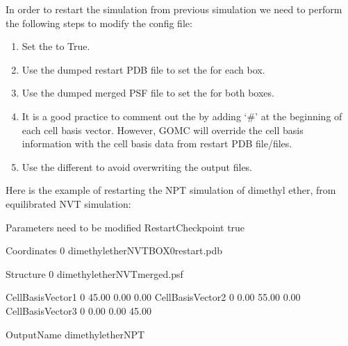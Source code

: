 \documentclass[letterpaper,10pt,english]{sphinxmanual}
\begin{document}
In order to restart the simulation from previous simulation we need to perform the following steps to modify the config file:
\begin{enumerate}
%
\item {} 
Set the  to True.

\item {} 
Use the dumped restart PDB file to set the  for each box.

\item {} 
Use the dumped merged PSF file to set the  for both boxes.

\item {} 
It is a good practice to comment out the  by adding ‘\#’ at the beginning of each cell basis vector. However, GOMC will override
the cell basis information with the cell basis data from restart PDB file/files.

\item {} 
Use the different  to avoid overwriting the output files.

\end{enumerate}

Here is the example of restarting the NPT simulation of dimethyl ether, from equilibrated NVT simulation:

\begin{sphinxVerbatim}[commandchars=\\\{\}]
\PYGZsh{}\PYGZsh{}\PYGZsh{}\PYGZsh{}\PYGZsh{}\PYGZsh{}\PYGZsh{}\PYGZsh{}\PYGZsh{}\PYGZsh{}\PYGZsh{}\PYGZsh{}\PYGZsh{}\PYGZsh{}\PYGZsh{}\PYGZsh{}\PYGZsh{}\PYGZsh{}\PYGZsh{}\PYGZsh{}\PYGZsh{}\PYGZsh{}\PYGZsh{}\PYGZsh{}\PYGZsh{}\PYGZsh{}\PYGZsh{}\PYGZsh{}\PYGZsh{}\PYGZsh{}\PYGZsh{}\PYGZsh{}\PYGZsh{}\PYGZsh{}\PYGZsh{}\PYGZsh{}\PYGZsh{}\PYGZsh{}\PYGZsh{}\PYGZsh{}\PYGZsh{}\PYGZsh{}\PYGZsh{}\PYGZsh{}\PYGZsh{}\PYGZsh{}\PYGZsh{}\PYGZsh{}\PYGZsh{}\PYGZsh{}\PYGZsh{}\PYGZsh{}\PYGZsh{}\PYGZsh{}\PYGZsh{}\PYGZsh{}
\PYGZsh{} Parameters need to be modified
\PYGZsh{}\PYGZsh{}\PYGZsh{}\PYGZsh{}\PYGZsh{}\PYGZsh{}\PYGZsh{}\PYGZsh{}\PYGZsh{}\PYGZsh{}\PYGZsh{}\PYGZsh{}\PYGZsh{}\PYGZsh{}\PYGZsh{}\PYGZsh{}\PYGZsh{}\PYGZsh{}\PYGZsh{}\PYGZsh{}\PYGZsh{}\PYGZsh{}\PYGZsh{}\PYGZsh{}\PYGZsh{}\PYGZsh{}\PYGZsh{}\PYGZsh{}\PYGZsh{}\PYGZsh{}\PYGZsh{}\PYGZsh{}\PYGZsh{}\PYGZsh{}\PYGZsh{}\PYGZsh{}\PYGZsh{}\PYGZsh{}\PYGZsh{}\PYGZsh{}\PYGZsh{}\PYGZsh{}\PYGZsh{}\PYGZsh{}\PYGZsh{}\PYGZsh{}\PYGZsh{}\PYGZsh{}\PYGZsh{}\PYGZsh{}\PYGZsh{}\PYGZsh{}\PYGZsh{}\PYGZsh{}\PYGZsh{}\PYGZsh{}
RestartCheckpoint   true

Coordinates     0   dimethylether\PYGZus{}NVT\PYGZus{}BOX\PYGZus{}0\PYGZus{}restart.pdb

Structure       0   dimethylether\PYGZus{}NVT\PYGZus{}merged.psf

\PYGZsh{}CellBasisVector1   0       45.00   0.00    0.00
\PYGZsh{}CellBasisVector2   0       0.00    55.00   0.00
\PYGZsh{}CellBasisVector3   0       0.00    0.00    45.00

OutputName          dimethylether\PYGZus{}NPT
\end{sphinxVerbatim}
\end{document}
